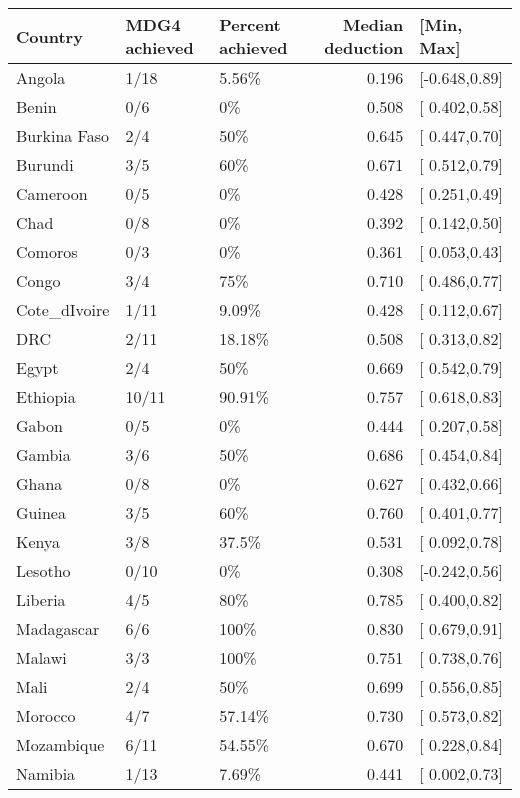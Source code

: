 \begin{table}[ht]
\centering
\begin{tabular}{lllrl}
  \hline
Country & MDG4 achieved & Percent achieved & Median deduction & [Min, Max] \\ 
  \hline
Angola & 1/18 & 5.56\% & 0.196 & [-0.648,0.89] \\ 
  Benin & 0/6 & 0\% & 0.508 & [ 0.402,0.58] \\ 
  Burkina Faso & 2/4 & 50\% & 0.645 & [ 0.447,0.70] \\ 
  Burundi & 3/5 & 60\% & 0.671 & [ 0.512,0.79] \\ 
  Cameroon & 0/5 & 0\% & 0.428 & [ 0.251,0.49] \\ 
  Chad & 0/8 & 0\% & 0.392 & [ 0.142,0.50] \\ 
  Comoros & 0/3 & 0\% & 0.361 & [ 0.053,0.43] \\ 
  Congo & 3/4 & 75\% & 0.710 & [ 0.486,0.77] \\ 
  Cote\_dIvoire & 1/11 & 9.09\% & 0.428 & [ 0.112,0.67] \\ 
  DRC & 2/11 & 18.18\% & 0.508 & [ 0.313,0.82] \\ 
  Egypt & 2/4 & 50\% & 0.669 & [ 0.542,0.79] \\ 
  Ethiopia & 10/11 & 90.91\% & 0.757 & [ 0.618,0.83] \\ 
  Gabon & 0/5 & 0\% & 0.444 & [ 0.207,0.58] \\ 
  Gambia & 3/6 & 50\% & 0.686 & [ 0.454,0.84] \\ 
  Ghana & 0/8 & 0\% & 0.627 & [ 0.432,0.66] \\ 
  Guinea & 3/5 & 60\% & 0.760 & [ 0.401,0.77] \\ 
  Kenya & 3/8 & 37.5\% & 0.531 & [ 0.092,0.78] \\ 
  Lesotho & 0/10 & 0\% & 0.308 & [-0.242,0.56] \\ 
  Liberia & 4/5 & 80\% & 0.785 & [ 0.400,0.82] \\ 
  Madagascar & 6/6 & 100\% & 0.830 & [ 0.679,0.91] \\ 
  Malawi & 3/3 & 100\% & 0.751 & [ 0.738,0.76] \\ 
  Mali & 2/4 & 50\% & 0.699 & [ 0.556,0.85] \\ 
  Morocco & 4/7 & 57.14\% & 0.730 & [ 0.573,0.82] \\ 
  Mozambique & 6/11 & 54.55\% & 0.670 & [ 0.228,0.84] \\ 
  Namibia & 1/13 & 7.69\% & 0.441 & [ 0.002,0.73] \\ 

\end{tabular}
\end{table}
